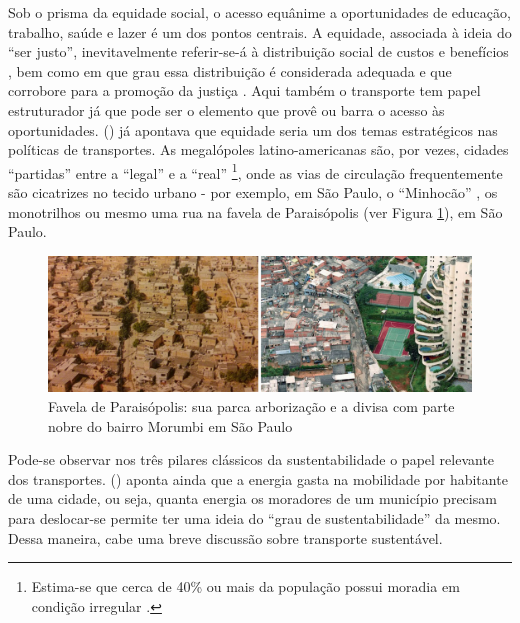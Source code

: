 Sob o prisma da equidade social, o acesso equânime a oportunidades de educação, trabalho, saúde e lazer é um dos pontos centrais. A equidade, associada à ideia do ``ser justo'', inevitavelmente referir-se-á à distribuição social de custos e benefícios , bem como em que grau essa distribuição é considerada adequada e que corrobore para a promoção da justiça \cite{LITMAN2006}. Aqui também o transporte tem papel estruturador já que pode ser o elemento que provê ou barra o acesso às oportunidades.  (\citeyear{SANCHEZ2003}) já apontava que equidade seria um dos temas estratégicos nas políticas de transportes. As megalópoles latino-americanas são, por vezes, cidades ``partidas'' \cite{VENTURA2001} entre a ``legal'' e a ``real'' \cite{ALVA1997}
\footnote{Estima-se que cerca de 40\% ou mais da população possui moradia em condição irregular \cite{FREITAG2007}.},
onde as vias de circulação frequentemente são cicatrizes no tecido urbano - por exemplo, em São Paulo, o ``Minhocão'' \cite{ABASCAL2010}, os monotrilhos \cite{ROLNIK2010} ou mesmo uma rua na favela de Paraisópolis (ver Figura \ref{fig:paraisopolis}), em São Paulo.

\begin{figure}[htb]%
    \caption{\label{fig:paraisopolis}Favela de Paraisópolis: sua parca arborização e a divisa com parte nobre do bairro Morumbi em São Paulo}%
    \begin{center}%
        \includegraphics[width=1.0\textwidth]{./imagens/paraisopolis.jpg}%
    \end{center}%
\end{figure}%

Pode-se observar nos três pilares clássicos da sustentabilidade o papel relevante dos transportes.  (\citeyear{VASCONCELLOS2012}) aponta ainda que a energia gasta na mobilidade por habitante de uma cidade, ou seja, quanta energia os moradores de um município precisam para deslocar-se permite ter uma ideia do ``grau de sustentabilidade'' da mesmo. Dessa maneira, cabe uma breve discussão sobre transporte sustentável.

